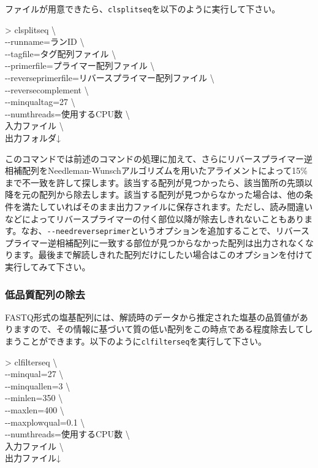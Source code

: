 \documentclass[titlepage,10pt,a4paper]{jsbook}
\newenvironment{cmd}{\begin{oframed}\raggedright\ttfamily\footnotesize\setlength{\baselineskip}{1.4em}}{\end{oframed}\vspace{-1em}}
\begin{document}
ファイルが用意できたら、\texttt{clsplitseq}を以下のように実行して下さい。
\begin{cmd}
{\textgreater} clsplitseq {\textbackslash}\\
{-}{-}runname=ランID {\textbackslash}\\
{-}{-}tagfile=タグ配列ファイル {\textbackslash}\\
{-}{-}primerfile=プライマー配列ファイル {\textbackslash}\\
{-}{-}reverseprimerfile=リバースプライマー配列ファイル {\textbackslash}\\
{-}{-}reversecomplement {\textbackslash}\\
{-}{-}minqualtag=27 {\textbackslash}\\
{-}{-}numthreads=使用するCPU数 {\textbackslash}\\
入力ファイル {\textbackslash}\\
出力フォルダ↓
\end{cmd}
このコマンドでは前述のコマンドの処理に加えて、さらにリバースプライマー逆相補配列をNeedleman-Wunschアルゴリズムを用いたアライメントによって15\%まで不一致を許して探します。該当する配列が見つかったら、該当箇所の先頭以降を元の配列から除去します。該当する配列が見つからなかった場合は、他の条件を満たしていればそのまま出力ファイルに保存されます。ただし、読み間違いなどによってリバースプライマーの付く部位以降が除去しきれないこともあります。なお、\texttt{{-}{-}needreverseprimer}というオプションを追加することで、リバースプライマー逆相補配列に一致する部位が見つからなかった配列は出力されなくなります。最後まで解読しきれた配列だけにしたい場合はこのオプションを付けて実行してみて下さい。

\subsubsection{低品質配列の除去}\label{subsubsection:qualityfilteringfor454}

FASTQ形式の塩基配列には、解読時のデータから推定された塩基の品質値がありますので、その情報に基づいて質の低い配列をこの時点である程度除去してしまうことができます。以下のように\texttt{clfilterseq}を実行して下さい。

\begin{cmd}
{\textgreater} clfilterseq {\textbackslash}\\
{-}{-}minqual=27 {\textbackslash}\\
{-}{-}minquallen=3 {\textbackslash}\\
{-}{-}minlen=350 {\textbackslash}\\
{-}{-}maxlen=400 {\textbackslash}\\
{-}{-}maxplowqual=0.1 {\textbackslash}\\
{-}{-}numthreads=使用するCPU数 {\textbackslash}\\
入力ファイル {\textbackslash}\\
出力ファイル↓
\end{cmd}
\end{document}
